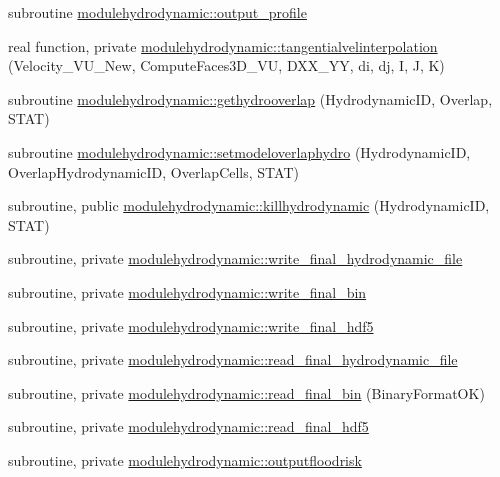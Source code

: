 \begin{DoxyCompactItemize}
\item 
subroutine \mbox{\hyperlink{namespacemodulehydrodynamic_aad9764fae86ae409938db759114d0a42}{modulehydrodynamic\+::output\+\_\+profile}}
\item 
real function, private \mbox{\hyperlink{namespacemodulehydrodynamic_a9df5dd894a61d9599540be689d68c03b}{modulehydrodynamic\+::tangentialvelinterpolation}} (Velocity\+\_\+\+V\+U\+\_\+\+New, Compute\+Faces3\+D\+\_\+\+VU, D\+X\+X\+\_\+\+YY, di, dj, I, J, K)
\item 
subroutine \mbox{\hyperlink{namespacemodulehydrodynamic_aaf559665e8122ee5d3cf650f45ac04fd}{modulehydrodynamic\+::gethydrooverlap}} (Hydrodynamic\+ID, Overlap, S\+T\+AT)
\item 
subroutine \mbox{\hyperlink{namespacemodulehydrodynamic_abd4cedd7ee17aecf0de70d7616270033}{modulehydrodynamic\+::setmodeloverlaphydro}} (Hydrodynamic\+ID, Overlap\+Hydrodynamic\+ID, Overlap\+Cells, S\+T\+AT)
\item 
subroutine, public \mbox{\hyperlink{namespacemodulehydrodynamic_a0f3d902c6ac5d0beab910d09d6037271}{modulehydrodynamic\+::killhydrodynamic}} (Hydrodynamic\+ID, S\+T\+AT)
\item 
subroutine, private \mbox{\hyperlink{namespacemodulehydrodynamic_a633e5bd5e4240a071e45a505396056eb}{modulehydrodynamic\+::write\+\_\+final\+\_\+hydrodynamic\+\_\+file}}
\item 
subroutine, private \mbox{\hyperlink{namespacemodulehydrodynamic_a5bdef2c140ebc772066fbee498f4cccb}{modulehydrodynamic\+::write\+\_\+final\+\_\+bin}}
\item 
subroutine, private \mbox{\hyperlink{namespacemodulehydrodynamic_af8baaec85d39b5b0c7ce04593a4ba674}{modulehydrodynamic\+::write\+\_\+final\+\_\+hdf5}}
\item 
subroutine, private \mbox{\hyperlink{namespacemodulehydrodynamic_aac2dc91eeafc8e79ef7e6399aca89537}{modulehydrodynamic\+::read\+\_\+final\+\_\+hydrodynamic\+\_\+file}}
\item 
subroutine, private \mbox{\hyperlink{namespacemodulehydrodynamic_a24c75082fcb309f40ebc8ab0a0493fc8}{modulehydrodynamic\+::read\+\_\+final\+\_\+bin}} (Binary\+Format\+OK)
\item 
subroutine, private \mbox{\hyperlink{namespacemodulehydrodynamic_a7e3a53d388991f1cae4f042edd8cc7fb}{modulehydrodynamic\+::read\+\_\+final\+\_\+hdf5}}
\item 
subroutine, private \mbox{\hyperlink{namespacemodulehydrodynamic_a98ea84afedb06cff0d55601f6e7b1494}{modulehydrodynamic\+::outputfloodrisk}}
\item 

\end{DoxyCompactItemize}
